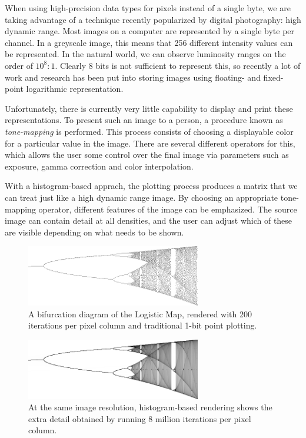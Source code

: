 \documentclass[letterpaper, 12pt]{article}
\begin{document}
When using high-precision data types for pixels instead of a single byte, we are taking
advantage of a technique recently popularized by digital photography: high dynamic range.
Most images on a computer are represented by a single byte per channel.  In a greyscale
image, this means that 256 different intensity values can be represented.  In the natural
world, we can observe luminosity ranges on the order of $10^8:1$.  Clearly 8 bits is not
sufficient to represent this, so recently a lot of work and research has been put into
storing images using floating- and fixed-point logarithmic representation.

Unfortunately, there is currently very little capability to display and print these
representations.  To present such an image to a person, a procedure known as
\emph{tone-mapping} is performed.  This process consists of choosing a displayable color for
a particular value in the image.  There are several different operators for this, which
allows the user some control over the final image via parameters such as exposure, gamma
correction and color interpolation.

With a histogram-based apprach, the plotting process produces a matrix that we can treat
just like a high dynamic range image.  By choosing an appropriate tone-mapping operator,
different features of the image can be emphasized.  The source image can contain detail
at all densities, and the user can adjust which of these are visible depending on what
needs to be shown.

\begin{subfigures}
\label{logistic}

\begin{figure}[htb]
\centering
\includegraphics[width=3in]{figures/logistic-traditional-200.png}
\caption{A bifurcation diagram of the Logistic Map, rendered with 200 iterations per pixel column and traditional 1-bit point plotting.}
\end{figure}

\begin{figure}[htb]
\centering
\includegraphics[width=3in]{figures/logistic-histogram-8m.png}
\caption{At the same image resolution, histogram-based rendering shows the extra detail obtained by running 8 million iterations per pixel column.}
\end{figure}

\end{subfigures}
\end{document}
